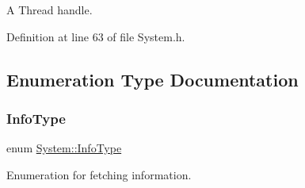 A Thread handle. 



Definition at line 63 of file System.\+h.



\subsection{Enumeration Type Documentation}
\mbox{\label{namespaceSystem_a71a46d52920ca8e98fc4649949be58a7}} 
\subsubsection{\texorpdfstring{Info\+Type}{InfoType}}
{\footnotesize\ttfamily enum \hyperlink{namespaceSystem_a71a46d52920ca8e98fc4649949be58a7}{System\+::\+Info\+Type}}



Enumeration for fetching information. 

